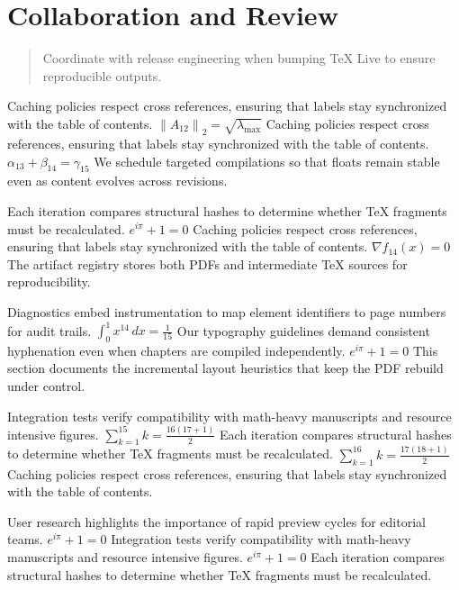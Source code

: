     \section{Collaboration and Review}
    
    \begin{quote}
      Coordinate with release engineering when bumping TeX Live to ensure reproducible outputs.
    \end{quote}
  
    Caching policies respect cross references, ensuring that labels stay synchronized with the table of contents.  $\left\|A_{12}\right\|_{2} = \sqrt{\lambda_{\max}}$  Caching policies respect cross references, ensuring that labels stay synchronized with the table of contents.  $\alpha_{13} + \beta_{14} = \gamma_{15}$  We schedule targeted compilations so that floats remain stable even as content evolves across revisions.
    \par
  
    Each iteration compares structural hashes to determine whether TeX fragments must be recalculated.  $e^{i\pi} + 1 = 0$  Caching policies respect cross references, ensuring that labels stay synchronized with the table of contents.  $\nabla f_{14}(x) = 0$  The artifact registry stores both PDFs and intermediate TeX sources for reproducibility.
    \par
  
    Diagnostics embed instrumentation to map element identifiers to page numbers for audit trails.  $\int_{0}^{1} x^{14} \, dx = \frac{1}{15}$  Our typography guidelines demand consistent hyphenation even when chapters are compiled independently.  $e^{i\pi} + 1 = 0$  This section documents the incremental layout heuristics that keep the PDF rebuild under control.
    \par
  
    Integration tests verify compatibility with math-heavy manuscripts and resource intensive figures.  $\sum_{k=1}^{15} k = \frac{16(17+1)}{2}$  Each iteration compares structural hashes to determine whether TeX fragments must be recalculated.  $\sum_{k=1}^{16} k = \frac{17(18+1)}{2}$  Caching policies respect cross references, ensuring that labels stay synchronized with the table of contents.
    \par
  
    User research highlights the importance of rapid preview cycles for editorial teams.  $e^{i\pi} + 1 = 0$  Integration tests verify compatibility with math-heavy manuscripts and resource intensive figures.  $e^{i\pi} + 1 = 0$  Each iteration compares structural hashes to determine whether TeX fragments must be recalculated.
    \par
  
